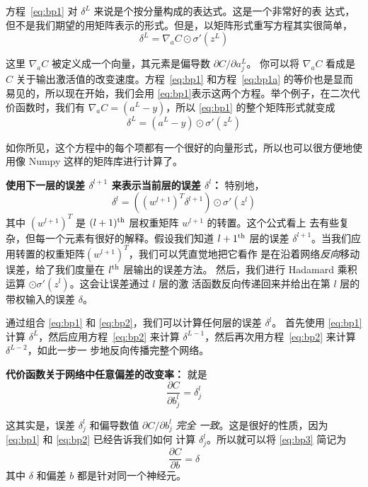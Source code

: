 方程~\eqref{eq:bp1} 对 $\delta^L$ 来说是个按分量构成的表达式。这是一个非常好的表
达式，但不是我们期望的用矩阵表示的形式。但是，以矩阵形式重写方程其实很简单，
\begin{equation}
  \delta^L = \nabla_a C \odot \sigma'(z^L)
  \label{eq:bp1a}\tag{BP1a}
\end{equation}

这里 $\nabla_a C$ 被定义成一个向量，其元素是偏导数 $\partial C/\partial a_j^L$。
你可以将 $\nabla_a C$ 看成是 $C$ 关于输出激活值的改变速度。方程~\eqref{eq:bp1}
和方程~\eqref{eq:bp1a} 的等价也是显而易见的，所以现在开始，我们会用
\eqref{eq:bp1}表示这两个方程。举个例子，在二次代价函数时，我们有 $\nabla_a C =
(a^L - y)$，所以 \eqref{eq:bp1} 的整个矩阵形式就变成
\begin{equation}
  \delta^L = (a^L-y) \odot \sigma'(z^L)
  \label{eq:30}\tag{30}
\end{equation}

如你所见，这个方程中的每个项都有一个很好的向量形式，所以也可以很方便地使用像
Numpy 这样的矩阵库进行计算了。

\textbf{使用下一层的误差 $\delta^{l+1}$ 来表示当前层的误差 $\delta^l$：} 特别地，
\begin{equation}
  \delta^l = ((w^{l+1})^T \delta^{l+1}) \odot \sigma'(z^l)
  \label{eq:bp2}\tag{BP2}
\end{equation}
其中 $(w^{l+1})^T$ 是 $(l+1)^{\rm th}$ 层权重矩阵 $w^{l+1}$ 的转置。这个公式看上
去有些复杂，但每一个元素有很好的解释。假设我们知道 $l+1^{\rm th}$ 层的误差
$\delta^{l+1}$。当我们应用转置的权重矩阵$(w^{l+1})^T$，我们可以凭直觉地把它看作
是在沿着网络\emph{反向}移动误差，给了我们度量在 $l^{\rm th}$ 层输出的误差方法。
然后，我们进行 Hadamard 乘积运算 $\odot \sigma'(z^l)$。这会让误差通过 $l$ 层的激
活函数反向传递回来并给出在第 $l$ 层的带权输入的误差 $\delta$。

通过组合 \eqref{eq:bp1} 和 \eqref{eq:bp2}，我们可以计算任何层的误差 $\delta^l$。
首先使用 \eqref{eq:bp1} 计算 $\delta^L$，然后应用方程~\eqref{eq:bp2} 来计算
$\delta^{L-1}$，然后再次用方程~\eqref{eq:bp2} 来计算 $\delta^{L-2}$，如此一步一
步地反向传播完整个网络。

\textbf{代价函数关于网络中任意偏差的改变率：} 就是
\begin{equation}
  \frac{\partial C}{\partial b^l_j} = \delta^l_j
  \label{eq:bp3}\tag{BP3}
\end{equation}

这其实是，误差 $\delta^l_j$ 和偏导数值 $\partial C / \partial b^l_j$ \emph{完全
  一致}。这是很好的性质，因为 \eqref{eq:bp1} 和 \eqref{eq:bp2} 已经告诉我们如何
计算 $\delta^l_j$。所以就可以将 \eqref{eq:bp3} 简记为
\begin{equation}
  \frac{\partial C}{\partial b} = \delta
  \label{eq:31}\tag{31}
\end{equation}
其中 $\delta$ 和偏差 $b$ 都是针对同一个神经元。

